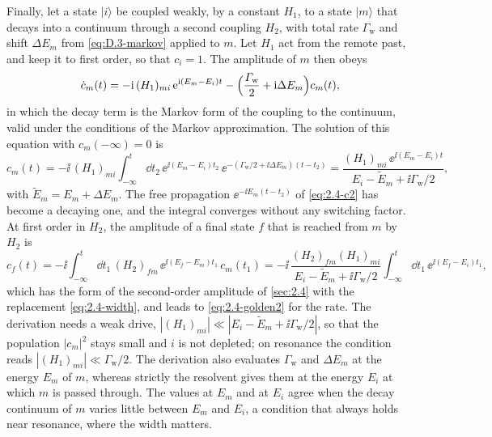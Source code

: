 Finally, let a state $|i\rangle$ be coupled weakly, by a constant $H_1$, to a state $|m\rangle$ that decays into a continuum through a second coupling $H_2$, with total rate $\varGamma_{\mathrm{w}}$ and shift $\Delta E_m$ from \cref{eq:D.3-markov} applied to $m$. Let $H_1$ act from the remote past, and keep it to first order, so that $c_i = 1$. The amplitude of $m$ then obeys
\begin{equation*}
  \dot c_m(t) = -\mathrm{i}\,(H_1)_{mi}\,\mathrm{e}^{\mathrm{i}(E_m - E_i)t} - \Bigl(\frac{\varGamma_{\mathrm{w}}}{2} + \mathrm{i}\Delta E_m\Bigr)c_m(t) ,
\end{equation*}
in which the decay term is the Markov form of the coupling to the continuum, valid under the conditions of the Markov approximation. The solution of this equation with $c_m(-\infty) = 0$ is
\begin{equation}
  c_m(t) = -\ii\,(H_1)_{mi}\int_{-\infty}^t\dd t_2\,\ee^{\ii(E_m - E_i)t_2}\,\ee^{-(\varGamma_{\mathrm{w}}/2 + \ii\Delta E_m)(t - t_2)}
  = \frac{(H_1)_{mi}\,\ee^{\ii(E_m - E_i)t}}{E_i - \tilde E_m + \ii\varGamma_{\mathrm{w}}/2} ,
  \label{eq:D.3-cm}
\end{equation}
with $\tilde E_m = E_m + \Delta E_m$. The free propagation $\ee^{-\ii E_m(t - t_2)}$ of \cref{eq:2.4-c2} has become a decaying one, and the integral converges without any switching factor. At first order in $H_2$, the amplitude of a final state $f$ that is reached from $m$ by $H_2$ is
\begin{equation*}
  c_f(t) = -\ii\int_{-\infty}^t\dd t_1\,(H_2)_{fm}\,\ee^{\ii(E_f - E_m)t_1}\,c_m(t_1)
  = -\ii\,\frac{(H_2)_{fm}(H_1)_{mi}}{E_i - \tilde E_m + \ii\varGamma_{\mathrm{w}}/2}\int_{-\infty}^t\dd t_1\,\ee^{\ii(E_f - E_i)t_1} ,
\end{equation*}
which has the form of the second-order amplitude of \cref{sec:2.4} with the replacement \cref{eq:2.4-width}, and leads to \cref{eq:2.4-golden2} for the rate. The derivation needs a weak drive, $|(H_1)_{mi}| \ll |E_i - \tilde E_m + \ii\varGamma_{\mathrm{w}}/2|$, so that the population $|c_m|^2$ stays small and $i$ is not depleted; on resonance the condition reads $|(H_1)_{mi}| \ll \varGamma_{\mathrm{w}}/2$. The derivation also evaluates $\varGamma_{\mathrm{w}}$ and $\Delta E_m$ at the energy $E_m$ of $m$, whereas strictly the resolvent gives them at the energy $E_i$ at which $m$ is passed through. The values at $E_m$ and at $E_i$ agree when the decay continuum of $m$ varies little between $E_m$ and $E_i$, a condition that always holds near resonance, where the width matters.
